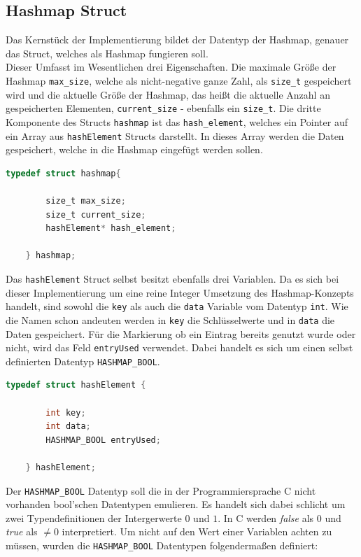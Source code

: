 \documentclass[11pt,a4paper]{article}
\begin{document}
\subsection{Hashmap Struct}
Das Kernstück der Implementierung bildet der Datentyp der Hashmap, genauer das Struct, welches als Hashmap fungieren soll.\\
Dieser Umfasst im Wesentlichen drei Eigenschaften. Die maximale Größe der Hashmap \lstinline{max_size}, welche als nicht-negative 
ganze Zahl, als \lstinline{size_t} gespeichert wird und die aktuelle Größe der Hashmap, das heißt die aktuelle Anzahl an gespeicherten 
Elementen, \lstinline{current_size} - ebenfalls ein \lstinline{size_t}. Die dritte Komponente des Structs \lstinline{hashmap} ist das 
\lstinline{hash_element}, welches ein Pointer auf ein Array aus \lstinline{hashElement} Structs darstellt. In dieses Array werden die Daten 
gespeichert, welche in die Hashmap eingefügt werden sollen.\\

\begin{lstlisting}[language=C]
    typedef struct hashmap{

        size_t max_size;
        size_t current_size;
        hashElement* hash_element;
        
    } hashmap;
\end{lstlisting}

Das \lstinline{hashElement} Struct selbst besitzt ebenfalls drei Variablen. Da es sich bei dieser Implementierung um eine reine Integer 
Umsetzung des Hashmap-Konzepts handelt, sind sowohl die \lstinline{key} als auch die \lstinline{data} Variable vom Datentyp \lstinline{int}.
Wie die Namen schon andeuten werden in \lstinline{key} die Schlüsselwerte und in \lstinline{data} die Daten gespeichert. Für die Markierung ob 
ein Eintrag bereits genutzt wurde oder nicht, wird das Feld \lstinline{entryUsed} verwendet. Dabei handelt es sich um einen selbst definierten 
Datentyp \lstinline{HASHMAP_BOOL}.\\

\begin{lstlisting}[language=C]
    typedef struct hashElement {

        int key;
        int data;
        HASHMAP_BOOL entryUsed;

    } hashElement;
\end{lstlisting}

Der \lstinline{HASHMAP_BOOL} Datentyp soll die in der Programmiersprache C nicht vorhanden bool'schen Datentypen emulieren. Es handelt sich dabei
schlicht um zwei Typendefinitionen der Intergerwerte $0$ und $1$. In C werden \textit{false} als $0$ und \textit{true} als $\neq 0$ interpretiert.
Um nicht auf den Wert einer Variablen achten zu müssen, wurden die \lstinline{HASHMAP_BOOL} Datentypen folgendermaßen definiert:\\
\end{document}
